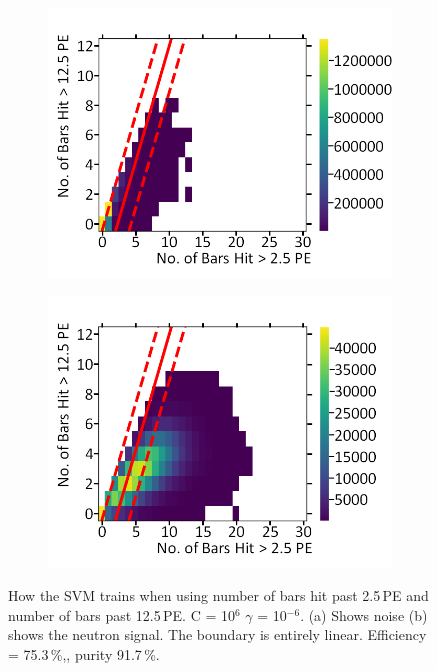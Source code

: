 \begin{figure}[!h]
\centering
\begin{subfigure}{.5\textwidth}
  \centering
  \includegraphics[width=\linewidth]{Appendix1/Figs/Bars1Bars2Noise.png}
  \captionsetup{width=.9\linewidth}
  \caption{}
  \label{subFig:Bars1Bars2N}
\end{subfigure}%
\begin{subfigure}{.5\textwidth}
  \centering
\includegraphics[width=\linewidth]{Appendix1/Figs/Bars1Bars2Signal.png}
  \captionsetup{width=.9\linewidth}
  \caption{}
  \label{subFig:Bars1Bar2S}
\end{subfigure}
\caption[LIBLINEAR SVM Nyström approximated RBF kernel for number of bars hit > 12.5\,PE vs number of bars hit > 2.5\,PE.]{How the SVM trains when using number of bars hit past 2.5\,PE and number of bars past 12.5\,PE. C = 10$^6$ $\gamma$ = 10$^{-6}$. (a) Shows noise (b) shows the neutron signal. The boundary is entirely linear. Efficiency = 75.3\,\%,, purity 91.7\,\%.}
\label{fig:Bars1BarsSN}
\end{figure}

